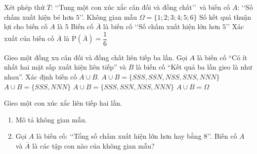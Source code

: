 \begin{ex}%
	Xét phép thử $T$: \lq\lq Tung một con xúc xắc cân đối và đồng chất\rq\rq\, và biến cố $A$: \lq\lq Số  chấm xuất hiện bé hơn $5$\rq\rq.
	\choiceTF 
		{\True  Không gian mẫu $\Omega=\{1;2;3;4;5;6\}$}
		{Số kết quả thuận lợi cho  biến cố $A$ là $5$}
		{Biến cố $\overline{A}$ là biến cố \lq\lq Số chấm  xuất hiện lớn hơn $5$\rq\rq}
		 {Xác xuất của biến cố $\overline{A}$ là $\mathrm{P}(\overline{A})=\dfrac{1}{6}$}
\end{ex}

\begin{ex}%
	Gieo một đồng xu cân đối và đồng chất liên tiếp ba lần. Gọi $A$  là biến cố ``Có ít nhất hai mặt sấp xuất hiện liên tiếp'' và $B$ là biến cố ``Kết quả ba lần gieo là như nhau''. Xác định biến cố $A \cup B$.
	 \choice
		{$A\cup B = \{SSS, SSN, NSS,SNS, NNN\}$} 
		{$A\cup B =  \{SSS, NNN\}$}
		 {\True $A\cup B = \{SSS, SSN, NSS, NNN\}$}
		 {$A\cup B = \Omega$}
\end{ex}

\begin{bt}%
	Gieo một con xúc xắc liên tiếp hai lần.
	\begin{enumerate}
	\item Mô tả không gian mẫu.
	\item Gọi $A$ là biến cố: \lq\lq Tổng số chấm xuất hiện lớn hơn hay bằng 8\rq\rq. Biến cố $A$ và $\overline{A}$ là các tập con nào của không gian mẫu?
	\end{enumerate}
\end{bt}

